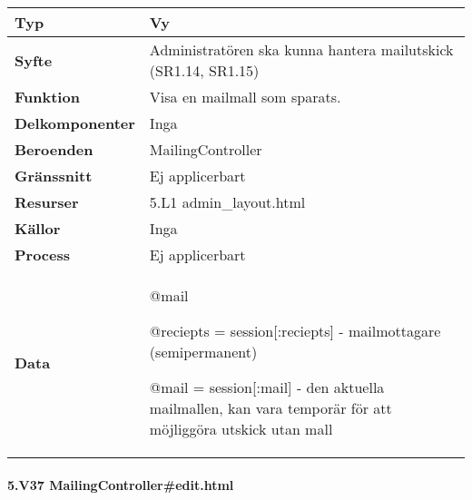 \documentclass[a4paper, twoside, 11pt, titlepage]{article}
\begin{document}
			\begin {table} [ht] \begin{tabular} {  p{3.5cm} p{11.6cm} }
				\hline
				{\sffamily\textbf{Typ}} & {Vy} \\
				\hline
				{\sffamily\textbf{Syfte}} & {Administratören ska kunna hantera mailutskick (SR1.14, SR1.15)} \\
				\hline
				{\sffamily\textbf{Funktion}} & {Visa en mailmall som sparats. } \\
				\hline
				{\sffamily\textbf{Delkomponenter}} & {Inga} \\
				\hline
				{\sffamily\textbf{Beroenden}} & {MailingController} \\
				\hline
				{\sffamily\textbf{Gränssnitt}} & {Ej applicerbart} \\
				\hline
				{\sffamily\textbf{Resurser}} & {5.L1 admin\_layout.html} \\
				\hline
				{\sffamily\textbf{Källor}} & {Inga} \\
				\hline
				{\sffamily\textbf{Process}} & {Ej applicerbart} \\
				\hline
				{\sffamily\textbf{Data}} & {@mail

@reciepts = session[:reciepts] - mailmottagare (semipermanent)

@mail = session[:mail] - den aktuella mailmallen, kan vara temporär för att möjliggöra utskick utan mall} \\
				\hline
			\end{tabular} \end{table} \FloatBarrier


			\clearpage %
			\paragraph{5.V37 MailingController\#edit.html}\
\end{document}
